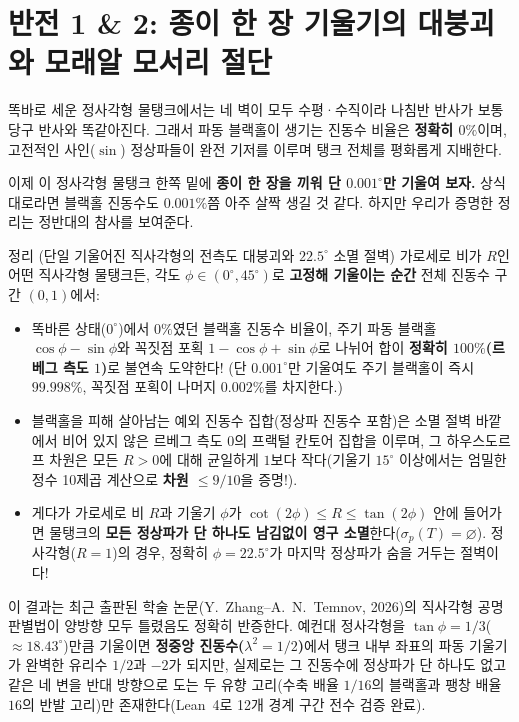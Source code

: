 \documentclass[11pt,a4paper]{article}
\begin{document}
\section{반전 1 \& 2: 종이 한 장 기울기의 대붕괴와 모래알 모서리 절단}

똑바로 세운 정사각형 물탱크에서는 네 벽이 모두 수평·수직이라 나침반 반사가 보통 당구 반사와 똑같아진다. 그래서 파동 블랙홀이 생기는 진동수 비율은 \textbf{정확히 $0\%$}이며, 고전적인 사인($\sin$) 정상파들이 완전 기저를 이루며 탱크 전체를 평화롭게 지배한다.

이제 이 정사각형 물탱크 한쪽 밑에 \textbf{종이 한 장을 끼워 단 $0.001^\circ$만 기울여 보자.} 상식대로라면 블랙홀 진동수도 $0.001\%$쯤 아주 살짝 생길 것 같다. 하지만 우리가 증명한 정리는 정반대의 참사를 보여준다.

\begin{wowbox}{정리 (단일 기울어진 직사각형의 전측도 대붕괴와 $22.5^\circ$ 소멸 절벽)}
가로세로 비가 $R$인 어떤 직사각형 물탱크든, 각도 $\phi \in (0^\circ, 45^\circ)$로 \textbf{고정해 기울이는 순간} 전체 진동수 구간 $(0,1)$에서:
\begin{itemize}
  \item 똑바른 상태($0^\circ$)에서 $0\%$였던 블랙홀 진동수 비율이, 주기 파동 블랙홀 $\cos\phi - \sin\phi$와 꼭짓점 포획 $1 - \cos\phi + \sin\phi$로 나뉘어 합이 \textbf{정확히 $100\%$(르베그 측도 $1$)}로 불연속 도약한다! (단 $0.001^\circ$만 기울여도 주기 블랙홀이 즉시 \textbf{$99.998\%$}, 꼭짓점 포획이 나머지 $0.002\%$를 차지한다.)
  \item 블랙홀을 피해 살아남는 예외 진동수 집합(정상파 진동수 포함)은 소멸 절벽 바깥에서 비어 있지 않은 르베그 측도 $0$의 프랙털 칸토어 집합을 이루며, 그 하우스도르프 차원은 모든 $R > 0$에 대해 균일하게 $1$보다 작다(기울기 $15^\circ$ 이상에서는 엄밀한 정수 10제곱 계산으로 \textbf{차원 $\le 9/10$}을 증명!).
  \item 게다가 가로세로 비 $R$과 기울기 $\phi$가 $\cot(2\phi) \le R \le \tan(2\phi)$ 안에 들어가면 물탱크의 \textbf{모든 정상파가 단 하나도 남김없이 영구 소멸}한다($\sigma_p(T) = \varnothing$). 정사각형($R=1$)의 경우, 정확히 \textbf{$\phi = 22.5^\circ$}가 마지막 정상파가 숨을 거두는 절벽이다!
\end{itemize}
\end{wowbox}

이 결과는 최근 출판된 학술 논문(Y.~Zhang--A.~N.~Temnov, 2026)의 직사각형 공명 판별법이 양방향 모두 틀렸음도 정확히 반증한다. 예컨대 정사각형을 $\tan\phi = 1/3$($\approx 18.43^\circ$)만큼 기울이면 \textbf{정중앙 진동수($\lambda^2 = 1/2$)}에서 탱크 내부 좌표의 파동 기울기가 완벽한 유리수 $1/2$과 $-2$가 되지만, 실제로는 그 진동수에 정상파가 단 하나도 없고 같은 네 변을 반대 방향으로 도는 두 유향 고리(수축 배율 $1/16$의 블랙홀과 팽창 배율 $16$의 반발 고리)만 존재한다(Lean~4로 12개 경계 구간 전수 검증 완료).
\end{document}
